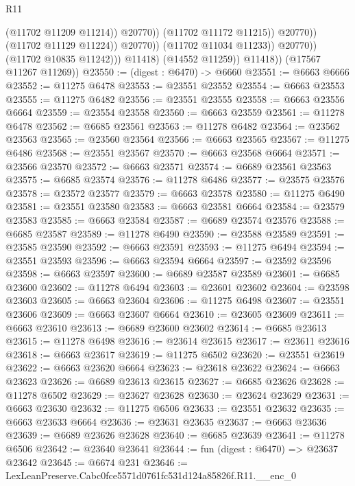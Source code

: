 \begin{lexlean}{R11}
\begin{coremodule}
                                          (@11702 @11209 @11214))
                                        @20770))
                                    (@11702 @11172 @11215))
                                  @20770))
                              (@11702 @11129 @11224))
                            @20770))
                        (@11702 @11034 @11233))
                      @20770))
                  (@11702 @10835 @11242)))
              @11418)
            (@14552 @11259))
          @11418))
      (@17567 @11267 @11269))
@23550 := (digest : @6470) -> @6660
@23551 := @6663 @6666
@23552 := @11275 @6478
@23553 := @23551 @23552
@23554 := @6663 @23553
@23555 := @11275 @6482
@23556 := @23551 @23555
@23558 := @6663 @23556 @6664
@23559 := @23554 @23558
@23560 := @6663 @23559
@23561 := @11278 @6478
@23562 := @6685 @23561
@23563 := @11278 @6482
@23564 := @23562 @23563
@23565 := @23560 @23564
@23566 := @6663 @23565
@23567 := @11275 @6486
@23568 := @23551 @23567
@23570 := @6663 @23568 @6664
@23571 := @23566 @23570
@23572 := @6663 @23571
@23574 := @6689 @23561 @23563
@23575 := @6685 @23574
@23576 := @11278 @6486
@23577 := @23575 @23576
@23578 := @23572 @23577
@23579 := @6663 @23578
@23580 := @11275 @6490
@23581 := @23551 @23580
@23583 := @6663 @23581 @6664
@23584 := @23579 @23583
@23585 := @6663 @23584
@23587 := @6689 @23574 @23576
@23588 := @6685 @23587
@23589 := @11278 @6490
@23590 := @23588 @23589
@23591 := @23585 @23590
@23592 := @6663 @23591
@23593 := @11275 @6494
@23594 := @23551 @23593
@23596 := @6663 @23594 @6664
@23597 := @23592 @23596
@23598 := @6663 @23597
@23600 := @6689 @23587 @23589
@23601 := @6685 @23600
@23602 := @11278 @6494
@23603 := @23601 @23602
@23604 := @23598 @23603
@23605 := @6663 @23604
@23606 := @11275 @6498
@23607 := @23551 @23606
@23609 := @6663 @23607 @6664
@23610 := @23605 @23609
@23611 := @6663 @23610
@23613 := @6689 @23600 @23602
@23614 := @6685 @23613
@23615 := @11278 @6498
@23616 := @23614 @23615
@23617 := @23611 @23616
@23618 := @6663 @23617
@23619 := @11275 @6502
@23620 := @23551 @23619
@23622 := @6663 @23620 @6664
@23623 := @23618 @23622
@23624 := @6663 @23623
@23626 := @6689 @23613 @23615
@23627 := @6685 @23626
@23628 := @11278 @6502
@23629 := @23627 @23628
@23630 := @23624 @23629
@23631 := @6663 @23630
@23632 := @11275 @6506
@23633 := @23551 @23632
@23635 := @6663 @23633 @6664
@23636 := @23631 @23635
@23637 := @6663 @23636
@23639 := @6689 @23626 @23628
@23640 := @6685 @23639
@23641 := @11278 @6506
@23642 := @23640 @23641
@23644 := fun (digest : @6470) => @23637 @23642
@23645 := @6674 @231
@23646 := LexLeanPreserve.Cabc0fce5571d0761fc531d124a85826f.R11.__enc_0

\end{coremodule}
\end{lexlean}
